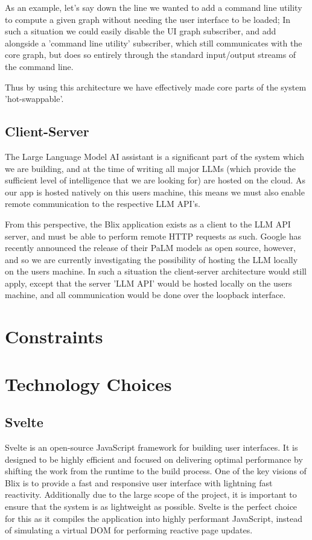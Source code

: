 \documentclass[11pt,a4paper]{article}
\begin{document}
As an example, let's say down the line we wanted to add a command line utility
to compute a given graph without needing the user interface to be loaded; In
such a situation we could easily disable the UI graph subscriber, and add
alongside a 'command line utility' subscriber, which still communicates with the
core graph, but does so entirely through the standard input/output streams of
the command line.

Thus by using this architecture we have effectively made core parts of the
system 'hot-swappable'.

\subsection{Client-Server}
The Large Language Model AI assistant is a significant part of the system which
we are building, and at the time of writing all major LLMs (which provide the
sufficient level of intelligence that we are looking for) are hosted on the
cloud. As our app is hosted natively on this users machine, this means we must
also enable remote communication to the respective LLM API's.

From this perspective, the Blix application exists as a client to the LLM API
server, and must be able to perform remote HTTP requests as such. Google has
recently announced the release of their PaLM models as open source, however, and
so we are currently investigating the possibility of hosting the LLM locally on
the users machine. In such a situation the client-server architecture would
still apply, except that the server 'LLM API' would be hosted locally on the
users machine, and all communication would be done over the loopback interface.

\section{Constraints}


\section{Technology Choices}

\subsection{Svelte}
Svelte is an open-source JavaScript framework for building user interfaces. It
is designed to be highly efficient and focused on delivering optimal performance
by shifting the work from the runtime to the build process. One of the key
visions of Blix is to provide a fast and responsive user interface with
lightning fast reactivity. Additionally due to the large scope of the project,
it is important to ensure that the system is as lightweight as possible. Svelte
is the perfect choice for this as it compiles the application into highly
performant JavaScript, instead of simulating a virtual DOM for performing
reactive page updates.
\end{document}
